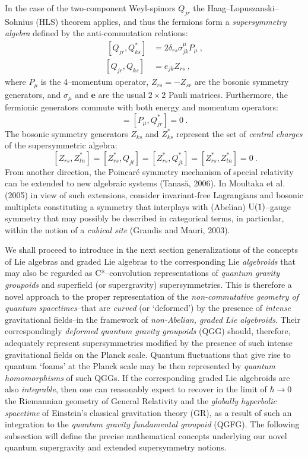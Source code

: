 \documentclass[12pt]{article}
\theoremstyle{plain}
\theoremstyle{definition}
\numberwithin{equation}{section}
\newcommand{\U}{{\rm U}}
\newcommand{\med}{\medbreak}
\newcommand{\<}{{\langle}}
\begin{document}
\med
In the case of the two-component Weyl-spinors $Q _{jr}$ the
Haag--Lopuszanski--Sohnius (HLS) theorem applies, and thus the
fermions form a \emph{supersymmetry algebra} defined by the
anti-commutation relations:
\begin{equation}
\begin{aligned}
~[Q _{jr}, Q _{ks}^*] &= 2\delta _{rs} \sigma^\mu _{jk} P _\mu ~,
\\ [Q _{jr}, Q _{ks}] &= e _{jk} Z _{rs} ~,
\end{aligned}
\end{equation}
where $P _\mu$ is the 4--momentum operator, $Z_{rs} = -Z _{s r}$
are the bosonic symmetry generators, and $\sigma _\mu$ and
$\mathbf{e}$ are the usual $2 \times 2$ Pauli matrices.
Furthermore, the fermionic generators commute with both energy and
momentum operators:
\begin{equation}
[P _\mu,Q _{jr}] = [P _\mu, Q^* _{jr}] = 0 ~.
\end{equation}
The bosonic symmetry generators $Z _{ks}$ and $Z^* _{ks}$
represent the set of \emph{central charges} of the supersymmetric
algebra:
\begin{equation}
~[Z _{rs}, Z^* _{tn}] = [Z^* _{rs}, Q _{jt}]=  [Z^* _{rs}, Q^*
_{jt}]= [Z^* _{rs}, Z^* _{tn}]=0 ~.
\end{equation}
From another direction, the Poincar\'e symmetry mechanism of
special relativity can be extended to new algebraic systems
(Tanas\u a, 2006). In Moultaka et al. (2005) in view of such
extensions, consider invariant-free Lagrangians and bosonic
multiplets  constituting a symmetry that interplays with (Abelian)
$\U(1)$--gauge symmetry that may possibly be described in
categorical terms, in particular, within the notion of a
\emph{cubical site} (Grandis and Mauri, 2003).

We shall proceed to introduce in the next section generalizations
of the concepts of Lie algebras and graded Lie algebras to the
corresponding Lie \emph{algebroids} that may also be regarded as
C*--convolution representations of \emph{quantum gravity
groupoids} and superfield (or supergravity) supersymmetries. This
is therefore a novel approach to the proper representation of the
\emph{non-commutative geometry of quantum spacetimes}--that are
\emph{curved} (or `deformed') by the presence of \emph{intense}
gravitational fields--in the framework of \emph{non-Abelian,
graded Lie algebroids}. Their correspondingly \emph{deformed
quantum gravity groupoids} (QGG) should, therefore, adequately
represent supersymmetries modified by the presence of such intense
gravitational fields on the Planck scale. Quantum fluctuations
that give rise to quantum `foams' at the Planck scale may be then
represented by \emph{quantum homomorphisms} of such QGGs. If the
corresponding graded Lie algebroids are also \emph{integrable},
then one can reasonably expect to recover in the limit of $\hbar
\rightarrow 0$ the Riemannian geometry of General Relativity and
the \emph{globally hyperbolic spacetime} of Einstein's classical
gravitation theory (GR), as a result of such an integration to the
\emph{quantum gravity fundamental groupoid} (QGFG). The following
subsection will define the precise mathematical concepts
underlying our novel quantum supergravity and extended
supersymmetry notions.
\end{document}
